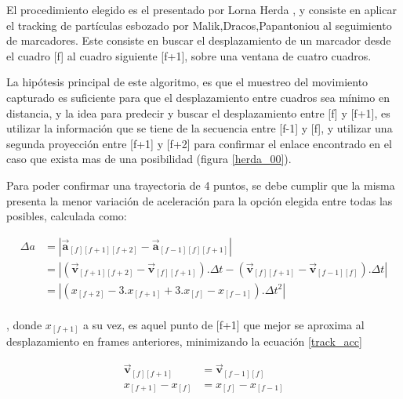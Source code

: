 El procedimiento elegido es el presentado por Lorna Herda\cite{herda} , y consiste en aplicar el tracking de partículas esbozado por Malik,Dracos,Papantoniou \cite{griegos} al seguimiento de marcadores. Este consiste en buscar el desplazamiento de un marcador desde el cuadro [f] al cuadro siguiente [f+1], sobre una ventana de cuatro cuadros.

La hipótesis principal de este algoritmo, es que el muestreo del movimiento capturado es suficiente para que el desplazamiento entre cuadros sea mínimo en distancia, y la idea para predecir y buscar el desplazamiento entre [f] y [f+1], es utilizar la información que se tiene de la secuencia entre [f-1] y [f], y utilizar una segunda proyección entre [f+1] y [f+2] para confirmar el enlace encontrado en el caso que exista mas de una posibilidad (figura \ref{herda_00}).

Para poder confirmar una trayectoria de 4 puntos, se debe cumplir que la misma presenta la menor variación de aceleración para la opción elegida entre todas las posibles, calculada como:

\begin{equation}
\begin{split}
\Delta{a}&= \left| \boldsymbol{\overrightarrow{a}}_{[f][f+1][f+2]}-\boldsymbol{\overrightarrow{a}}_{[f-1][f][f+1]} \right| \\
&= \left| \left(\boldsymbol{\overrightarrow{v}}_{[f+1][f+2]}-\boldsymbol{\overrightarrow{v}}_{[f][f+1]}\right).\Delta{t}-\left(\boldsymbol{\overrightarrow{v}}_{[f][f+1]}-\boldsymbol{\overrightarrow{v}}_{[f-1][f]}\right).\Delta{t} \right| \\
&= \left|\left( x_{[f+2]} - 3.x_{[f+1]} + 3.x_{[f]} - x_{[f-1]} \right).\Delta{t}^2\right|\\
\end{split}
\label{track_var_acc}
\end{equation}

, donde $x_{[f+1]}$ a su vez, es aquel punto de [f+1] que mejor se aproxima al desplazamiento en frames anteriores, minimizando la ecuación \ref{track_acc} 

\begin{equation}
\begin{split}
\boldsymbol{\overrightarrow{v}}_{[f][f+1]}& = \boldsymbol{\overrightarrow{v}}_{[f-1][f]} \\
x_{[f+1]}-x_{[f]}& = x_{[f]}-x_{[f-1]} \\
\end{split}
\label{track_acc}
\end{equation}

